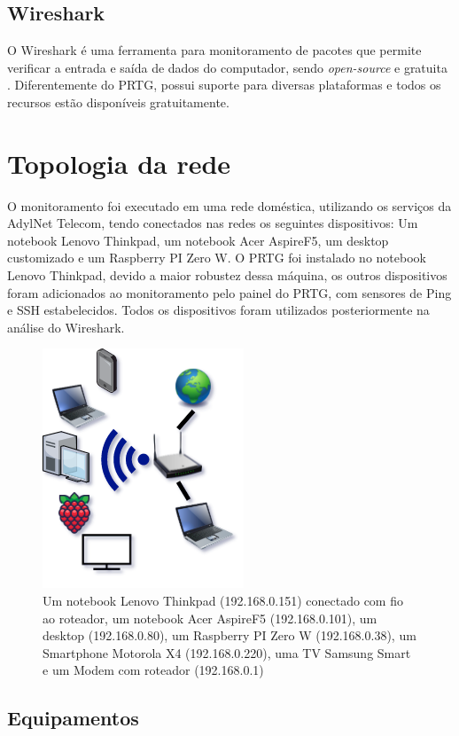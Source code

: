 \documentclass[12pt]{article}
\begin{document}
\subsection{Wireshark}

O Wireshark é uma ferramenta para monitoramento de pacotes que permite verificar a entrada e saída de dados do computador, sendo \emph{open-source} e gratuita . Diferentemente do PRTG, possui suporte para diversas plataformas e todos os recursos estão disponíveis gratuitamente.

\section{Topologia da rede}

O monitoramento foi executado em uma rede doméstica, utilizando os serviços da AdylNet Telecom, tendo conectados nas redes os seguintes dispositivos: Um notebook Lenovo Thinkpad, um notebook Acer AspireF5, um desktop customizado e um Raspberry PI Zero W. O PRTG foi instalado no notebook Lenovo Thinkpad, devido a maior robustez dessa máquina, os outros dispositivos foram adicionados ao monitoramento pelo painel do PRTG, com sensores de Ping e SSH estabelecidos. Todos os dispositivos foram utilizados posteriormente na análise do Wireshark.

\begin{figure}[H]
    \includegraphics{topologia.png}
    \caption{Um notebook Lenovo Thinkpad (192.168.0.151) conectado com fio ao roteador, um notebook Acer AspireF5 (192.168.0.101), um desktop (192.168.0.80), um Raspberry PI Zero W (192.168.0.38), um Smartphone Motorola X4 (192.168.0.220), uma TV Samsung Smart e um Modem com roteador (192.168.0.1)}
\end{figure}

\subsection{Equipamentos}
\end{document}
